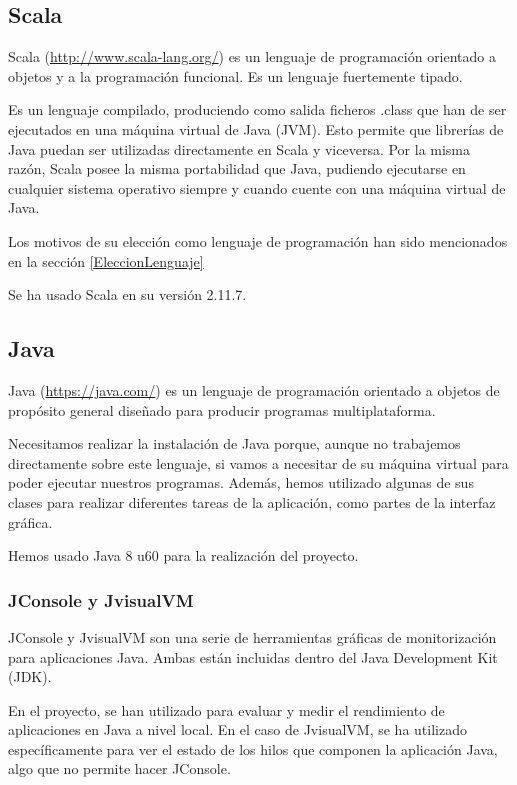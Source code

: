 \subsection{Scala}

Scala (\url{http://www.scala-lang.org/}) es un lenguaje de programación orientado a objetos y a la programación funcional. Es un lenguaje fuertemente tipado.

Es un lenguaje compilado, produciendo como salida ficheros .class que han de ser ejecutados en una máquina virtual de Java (JVM). Esto permite que librerías de Java puedan ser utilizadas directamente en Scala y viceversa. Por la misma razón, Scala posee la misma portabilidad que Java, pudiendo ejecutarse en cualquier sistema operativo siempre y cuando cuente con una máquina virtual de Java. 

Los motivos de su elección como lenguaje de programación han sido mencionados en la sección \ref{EleccionLenguaje}

Se ha usado Scala en su versión 2.11.7.

\subsection{Java}

Java (\url{https://java.com/}) es un lenguaje de programación orientado a objetos de propósito general diseñado para producir programas multiplataforma.

Necesitamos realizar la instalación de Java porque, aunque no trabajemos directamente sobre este lenguaje, si vamos a necesitar de su máquina virtual para poder ejecutar nuestros programas. Además, hemos utilizado algunas de sus clases para realizar diferentes tareas de la aplicación, como partes de la interfaz gráfica.

Hemos usado Java 8 u60 para la realización del proyecto.

\subsubsection{JConsole y JvisualVM}\label{DefJConsole}\label{DefJvisualVM}

JConsole y JvisualVM son una serie de herramientas gráficas de monitorización para aplicaciones Java. Ambas están incluidas dentro del Java Development Kit (JDK).

En el proyecto, se han utilizado para evaluar y medir el rendimiento de aplicaciones en Java a nivel local. En el caso de JvisualVM, se ha utilizado específicamente para ver el estado de los hilos que componen la aplicación Java, algo que no permite hacer JConsole.


